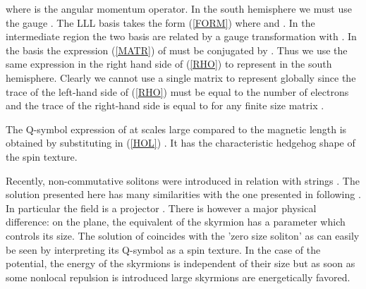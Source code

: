 \documentclass[a4paper,11pt]{article}
\begin{document}
where \coordHE{} is the angular momentum operator.
In the south hemisphere we must use the gauge \coordHE{}.
The LLL basis \coordHE{} takes the form (\ref{FORM})
where \coordHE{} and 
\coordHE{}. In the intermediate region the two basis are related
by a gauge transformation 
\coordHE{} with \coordHE{}.
In the basis \coordHE{} the expression (\ref{MATR}) of \coordHE{}
must be conjugated by \coordHE{}.
Thus we use the same expression 
\coordHE{} in the right hand side of (\ref{RHO})
to represent \coordHE{} in the south hemisphere.
Clearly we cannot use a single matrix \myHighlight{$\sigma$}\coordHE{}
to represent \coordHE{} globally since the trace of 
the left-hand side of (\ref{RHO})
must be equal to the number of electrons \coordHE{} and the trace of the right-hand side
is equal to \coordHE{} for any finite size matrix \myHighlight{$\sigma$}\coordHE{}.

The Q-symbol expression of \coordHE{} at scales large compared to the magnetic length 
is obtained by substituting in (\ref{HOL}) \coordHE{}.
It has the characteristic hedgehog shape
of the spin texture. 

Recently, non-commutative solitons were introduced in relation with strings \cite{GOP}.
The solution presented here has many similarities with the one presented in \cite{WIT}
following \cite{MUK,HAR}.
In particular the field \coordHE{} is a projector \coordHE{}.
There is however a major physical difference: 
on the plane, the equivalent of the skyrmion \cite{MAC} has a parameter
which controls its size.
The solution \coordHE{} of \cite{WIT} coincides with the 'zero size soliton' as can easily be seen
by interpreting its Q-symbol as a spin texture.
In the case of the \myHighlight{$\delta$}\coordHE{} potential, the energy of the skyrmions
is independent of their size
but as soon as some nonlocal repulsion is introduced large skyrmions are 
energetically favored. 
\end{document}
